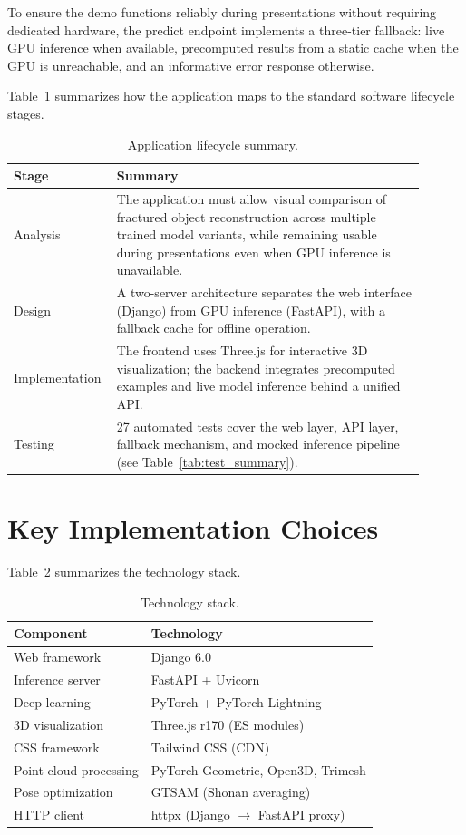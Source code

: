 To ensure the demo functions reliably during presentations without requiring dedicated hardware, the predict endpoint implements a three-tier fallback: live GPU inference when available, precomputed results from a static cache when the GPU is unreachable, and an informative error response otherwise.

Table~\ref{tab:app_lifecycle} summarizes how the application maps to the standard software lifecycle stages.

\begin{table}[H]
\centering
\caption{Application lifecycle summary.}
\label{tab:app_lifecycle}
\begin{tabular}{p{0.18\linewidth}p{0.72\linewidth}}
\toprule
\textbf{Stage} & \textbf{Summary} \\
\midrule
Analysis & The application must allow visual comparison of fractured object reconstruction across multiple trained model variants, while remaining usable during presentations even when GPU inference is unavailable. \\
Design & A two-server architecture separates the web interface (Django) from GPU inference (FastAPI), with a fallback cache for offline operation. \\
Implementation & The frontend uses Three.js for interactive 3D visualization; the backend integrates precomputed examples and live model inference behind a unified API. \\
Testing & 27 automated tests cover the web layer, API layer, fallback mechanism, and mocked inference pipeline (see Table~\ref{tab:test_summary}). \\
\bottomrule
\end{tabular}
\end{table}

\section{Key Implementation Choices}

Table~\ref{tab:technologies} summarizes the technology stack.

\begin{table}[H]
\centering
\caption{Technology stack.}
\label{tab:technologies}
\begin{tabular}{ll}
\toprule
\textbf{Component} & \textbf{Technology} \\
\midrule
Web framework & Django 6.0 \\
Inference server & FastAPI + Uvicorn \\
Deep learning & PyTorch + PyTorch Lightning \\
3D visualization & Three.js r170 (ES modules) \\
CSS framework & Tailwind CSS (CDN) \\
Point cloud processing & PyTorch Geometric, Open3D, Trimesh \\
Pose optimization & GTSAM (Shonan averaging) \\
HTTP client & httpx (Django $\to$ FastAPI proxy) \\
\bottomrule
\end{tabular}
\end{table}

